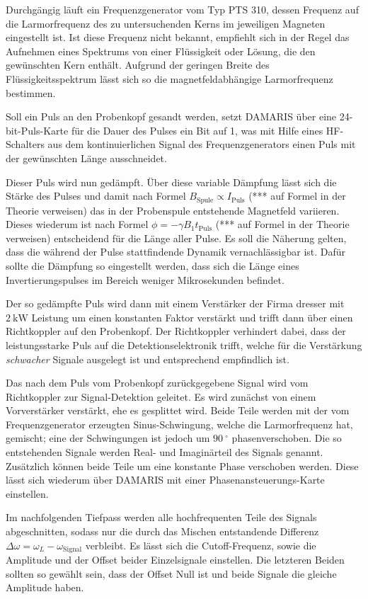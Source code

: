 Durchgängig läuft ein Frequenzgenerator vom Typ PTS 310, dessen Frequenz auf die Larmorfrequenz des zu untersuchenden Kerns im jeweiligen Magneten eingestellt ist. Ist diese Frequenz nicht bekannt, empfiehlt sich in der Regel das Aufnehmen eines Spektrums von einer Flüssigkeit oder Lösung, die den gewünschten Kern enthält. Aufgrund der geringen Breite des Flüssigkeitsspektrum lässt sich so die magnetfeldabhängige Larmorfrequenz bestimmen.

Soll ein Puls an den Probenkopf gesandt werden, setzt DAMARIS über eine 24-bit-Puls-Karte für die Dauer des Pulses ein Bit auf 1, was mit Hilfe eines HF-Schalters aus dem kontinuierlichen Signal des Frequenzgenerators einen Puls mit der gewünschten Länge ausschneidet.

Dieser Puls wird nun gedämpft. Über diese variable Dämpfung lässt sich die Stärke des Pulses und damit nach Formel $B_\text{Spule} \propto I_\text{Puls}$ (*** auf Formel in der Theorie verweisen) das in der Probenspule entstehende Magnetfeld variieren. Dieses wiederum ist nach Formel $\phi = - \gamma B_1 t_\text{Puls}$ (*** auf Formel in der Theorie verweisen) entscheidend für die Länge aller Pulse. Es soll die Näherung gelten, dass die während der Pulse stattfindende Dynamik vernachlässigbar ist. Dafür sollte die Dämpfung so eingestellt werden, dass sich die Länge eines Invertierungspulses im Bereich weniger Mikrosekunden befindet.

Der so gedämpfte Puls wird dann mit einem Verstärker der Firma dresser mit $\SI{2}{\kilo\watt}$ Leistung um einen konstanten Faktor verstärkt und trifft dann über einen Richtkoppler auf den Probenkopf. Der Richtkoppler verhindert dabei, dass der leistungsstarke Puls auf die Detektionselektronik trifft, welche für die Verstärkung \emph{schwacher} Signale ausgelegt ist und entsprechend empfindlich ist.

Das nach dem Puls vom Probenkopf zurückgegebene Signal wird vom Richtkoppler zur Signal-Detektion geleitet. Es wird zunächst von einem Vorverstärker verstärkt, ehe es gesplittet wird. Beide Teile werden mit der vom Frequenzgenerator erzeugten Sinus-Schwingung, welche die Larmorfrequenz hat, gemischt; eine der Schwingungen ist jedoch um $\SI{90}{^\circ}$ phasenverschoben. Die so entstehenden Signale werden Real- und Imaginärteil des Signals genannt. Zusätzlich können beide Teile um eine konstante Phase verschoben werden. Diese lässt sich wiederum über DAMARIS mit einer Phasenansteuerungs-Karte einstellen.

Im nachfolgenden Tiefpass werden alle hochfrequenten Teile des Signals abgeschnitten, sodass nur die durch das Mischen entstandende Differenz $\Delta \omega = \omega_L - \omega_\text{Signal}$ verbleibt. Es lässt sich die Cutoff-Frequenz, sowie die Amplitude und der Offset beider Einzelsignale einstellen. Die letzteren Beiden sollten so gewählt sein, dass der Offset Null ist und beide Signale die gleiche Amplitude haben.


